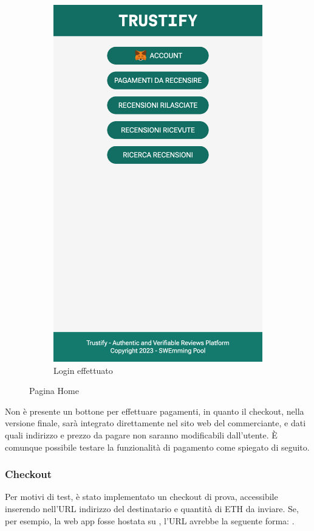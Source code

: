 \begin{figure}[t]
\begin{subfigure}{0.4\textwidth}
    \includegraphics[width=0.9\linewidth]{src/img/home_login.png}
    \caption{Login effettuato}\label{fig:home_login}
    \end{subfigure}

    \caption{Pagina Home}\label{fig:home}
\end{figure}

Non è presente un bottone per effettuare pagamenti, in quanto il checkout, nella versione finale, sarà integrato direttamente nel sito web del commerciante, e dati quali indirizzo e prezzo da pagare non saranno modificabili dall'utente. È comunque possibile testare la funzionalità di pagamento come spiegato di seguito.

\subsubsection{Checkout}
Per motivi di test, è stato implementato un checkout di prova, accessibile inserendo nell'URL indirizzo del destinatario e quantità di ETH da inviare. Se, per esempio, la web app fosse hostata su , l'URL avrebbe la seguente forma: .

